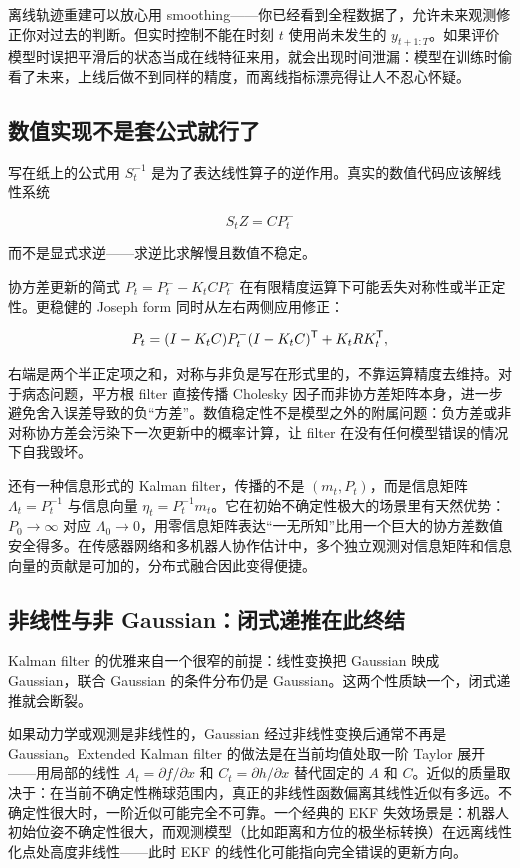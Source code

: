 离线轨迹重建可以放心用 smoothing——你已经看到全程数据了，允许未来观测修正你对过去的判断。但实时控制不能在时刻 \(t\) 使用尚未发生的 \(y_{t+1:T}\)。如果评价模型时误把平滑后的状态当成在线特征来用，就会出现时间泄漏：模型在训练时偷看了未来，上线后做不到同样的精度，而离线指标漂亮得让人不忍心怀疑。

\subsection{数值实现不是套公式就行了}

写在纸上的公式用 \(S_t^{-1}\) 是为了表达线性算子的逆作用。真实的数值代码应该解线性系统

\[
S_t Z = C P_t^-
\]

而不是显式求逆——求逆比求解慢且数值不稳定。

协方差更新的简式 \(P_t = P_t^- - K_t C P_t^-\) 在有限精度运算下可能丢失对称性或半正定性。更稳健的 Joseph form 同时从左右两侧应用修正：

\[
P_t = (I - K_t C) P_t^- (I - K_t C)^{\mathsf{T}} + K_t R K_t^{\mathsf{T}},
\]

右端是两个半正定项之和，对称与非负是写在形式里的，不靠运算精度去维持。对于病态问题，平方根 filter 直接传播 Cholesky 因子而非协方差矩阵本身，进一步避免舍入误差导致的负``方差''。数值稳定性不是模型之外的附属问题：负方差或非对称协方差会污染下一次更新中的概率计算，让 filter 在没有任何模型错误的情况下自我毁坏。

还有一种信息形式的 Kalman filter，传播的不是 \((m_t, P_t)\)，而是信息矩阵 \(\Lambda_t = P_t^{-1}\) 与信息向量 \(\eta_t = P_t^{-1} m_t\)。它在初始不确定性极大的场景里有天然优势：\(P_0 \to \infty\) 对应 \(\Lambda_0 \to 0\)，用零信息矩阵表达``一无所知''比用一个巨大的协方差数值安全得多。在传感器网络和多机器人协作估计中，多个独立观测对信息矩阵和信息向量的贡献是可加的，分布式融合因此变得便捷。

\subsection{非线性与非 Gaussian：闭式递推在此终结}

Kalman filter 的优雅来自一个很窄的前提：线性变换把 Gaussian 映成 Gaussian，联合 Gaussian 的条件分布仍是 Gaussian。这两个性质缺一个，闭式递推就会断裂。

如果动力学或观测是非线性的，Gaussian 经过非线性变换后通常不再是 Gaussian。Extended Kalman filter 的做法是在当前均值处取一阶 Taylor 展开——用局部的线性 \(A_t = \partial f / \partial x\) 和 \(C_t = \partial h / \partial x\) 替代固定的 \(A\) 和 \(C\)。近似的质量取决于：在当前不确定性椭球范围内，真正的非线性函数偏离其线性近似有多远。不确定性很大时，一阶近似可能完全不可靠。一个经典的 EKF 失效场景是：机器人初始位姿不确定性很大，而观测模型（比如距离和方位的极坐标转换）在远离线性化点处高度非线性——此时 EKF 的线性化可能指向完全错误的更新方向。

